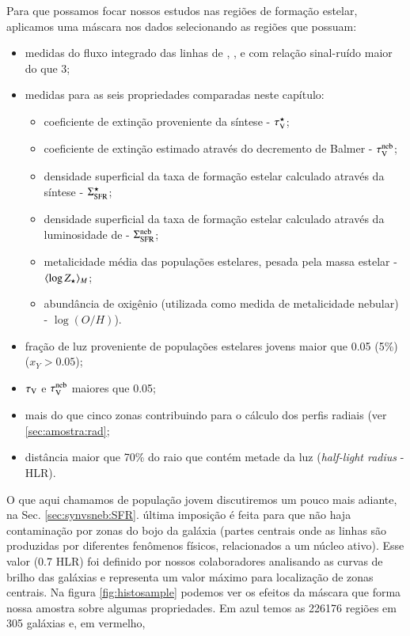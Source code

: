 Para que possamos focar nossos estudos nas regiões de formação estelar, aplicamos uma máscara nos
dados selecionando as regiões que possuam:
\begin{itemize}
  \item medidas do fluxo integrado das linhas de \Hbeta, \oIII, \Halpha e \nII com relação
sinal-ruído maior do que 3;
  \item medidas para as seis propriedades comparadas neste capítulo:
  \begin{itemize}
    \item coeficiente de extinção proveniente da síntese - $\tau_{\mathrm{V}}^\star$;
    \item coeficiente de extinção estimado através do decremento de Balmer - $\tau_{\mathrm{V}}^{\mathrm{neb}}$;
    \item densidade superficial da taxa de formação estelar calculado através da síntese -
$\Sigma_{\mathrm{SFR}}^\star$;
	\item densidade superficial da taxa de formação estelar calculado através da luminosidade de
\Halpha - $\Sigma_{\mathrm{SFR}}^{\mathrm{neb}}$;
	\item metalicidade média das populações estelares, pesada pela massa estelar - $\meanM{\log
Z_\star}$;
	\item abundância de oxigênio (utilizada como medida de metalicidade nebular) - $\log(O/H)$).
  \end{itemize}
  \item fração de luz proveniente de populações estelares jovens maior que 0.05 (5\%) ($x_Y >
0.05$);
  \item $\tau_{\mathrm{V}}$ e $\tau_{\mathrm{V}}^{\mathrm{neb}}$ maiores que 0.05;
  \item mais do que cinco zonas contribuindo para o cálculo dos perfis radiais (ver
\ref{sec:amostra:rad};
  \item distância maior que 70\% do raio que contém metade da luz ({\em half-light radius} - HLR).
\end{itemize}
\noindent O que aqui chamamos de população jovem discutiremos um pouco mais adiante, na Sec.
\ref{sec:synvsneb:SFR}. última imposição é feita para que não haja contaminação por zonas
do bojo da galáxia (partes centrais onde as linhas são produzidas por diferentes fenômenos físicos,
relacionados a um núcleo ativo). Esse valor (0.7 HLR) foi definido por nossos colaboradores
analisando as curvas de brilho das galáxias e representa um valor máximo para localização de zonas
centrais. Na figura \ref{fig:histosample} podemos ver os efeitos da máscara que forma nossa
amostra sobre algumas propriedades. Em azul temos as 226176 regiões em 305 galáxias e, em vermelho,
